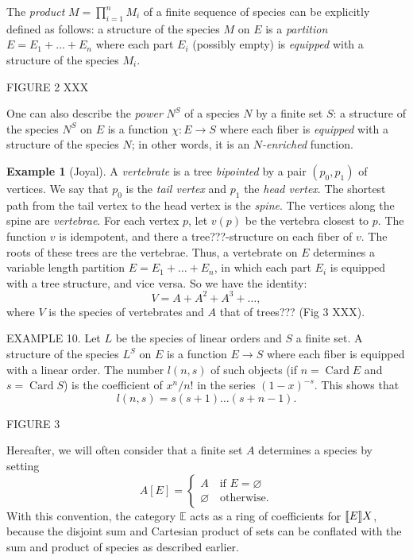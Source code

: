 \documentclass{article}
\theoremstyle{definition}
\newtheorem{ex}{Example}
\theoremstyle{remark}
\newcommand{\E}{\mathbb{E}}
\DeclareMathOperator{\Card}{Card}
\newcommand{\term}[1]{\emph{#1}}
\begin{document}
The \emph{product} $M = \prod_{i=1}^n M_i$ of a finite sequence of
species can be explicitly defined as follows: a structure of the
species $M$ on $E$ is a \emph{partition} $E = E_1 + \dots + E_n$ where
each part $E_i$ (possibly empty) is \emph{equipped} with a structure
of the species $M_i$.

FIGURE 2 XXX

One can also describe the \term{power} $N^S$ of a species $N$ by a
finite set $S$: a structure of the species $N^S$ on $E$ is a function
$\chi : E \to S$ where each fiber is \emph{equipped} with a structure
of the species $N$; in other words, it is an \emph{$N$-enriched}
function.


\begin{ex}[Joyal]
  A \emph{vertebrate} is a tree \term{bipointed} by a pair $(p_0,
  p_1)$ of vertices. We say that $p_0$ is the \term{tail vertex} and
  $p_1$ the \term{head vertex}. The shortest path from the tail vertex
  to the head vertex is the \term{spine}. The vertices along the spine
  are \term{vertebrae}. For each vertex $p$, let $v(p)$ be the
  vertebra closest to $p$. The function $v$ is idempotent, and there a
  tree???-structure on each fiber of $v$.  The roots of these trees
  are the vertebrae. Thus, a vertebrate on $E$ determines a variable
  length partition $E = E_1 + \dots + E_n$, in which each part $E_i$
  is equipped with a tree structure, and vice versa. So we have the
  identity:
  \[ V = A + A^2 + A^3 + \dots, \] where $V$ is the species of
  vertebrates and $A$ that of trees??? (Fig 3 XXX).
\end{ex}

EXAMPLE 10. Let $L$ be the species of linear orders and $S$ a finite set.
A structure of the species $L^S$ on $E$ is a function $E \to S$ where each
fiber is equipped with a linear order. The number $l(n, s)$ of such objects (if
$n = \Card E$ and $s = \Card S$) is the coefficient of $x^n/n!$ in the series
$(1-x)^{-s}$. This shows that
\[ l(n, s) = s (s + 1) \dots (s + n-1). \]

FIGURE 3

Hereafter, we will often consider that a finite set $A$
determines a species by setting
\[ A [E] = \begin{cases} A \quad \text{if $E = \varnothing$} \\ \varnothing \quad \text{otherwise}. \end{cases} \]
With this convention, the category $\E$ acts as a ring of coefficients
for $\Poly \E X$, because the disjoint sum and Cartesian product of sets
can be conflated with the sum and product of species as described
earlier.
\end{document}
